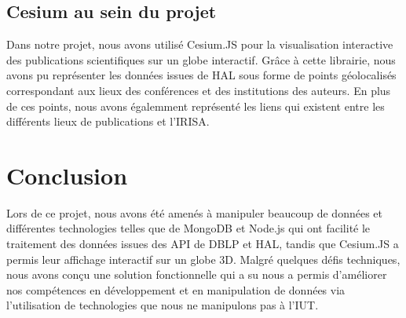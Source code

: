 \documentclass[a4paper,12pt]{article}
\begin{document}
\subsection{Cesium au sein du projet}
Dans notre projet, nous avons utilisé Cesium.JS pour la visualisation interactive des publications scientifiques sur un globe interactif. Grâce à cette librairie, nous avons pu représenter les données issues de HAL sous forme de points géolocalisés 
correspondant aux lieux des conférences et des institutions des auteurs. En plus de ces points, nous avons égalemment représenté les liens qui existent entre les différents lieux de publications et l'IRISA.


\section{Conclusion}
Lors de ce projet, nous avons été amenés à manipuler beaucoup de données et différentes technologies telles que de MongoDB et Node.js qui ont facilité le traitement des données issues des API de DBLP et HAL, tandis que Cesium.JS a permis leur affichage 
interactif sur un globe 3D. Malgré quelques défis techniques, nous avons conçu une solution fonctionnelle qui a su nous a permis d'améliorer nos compétences en développement et en manipulation de données via l'utilisation de technologies que nous ne 
manipulons pas à l'IUT.

\newpage
\end{document}
